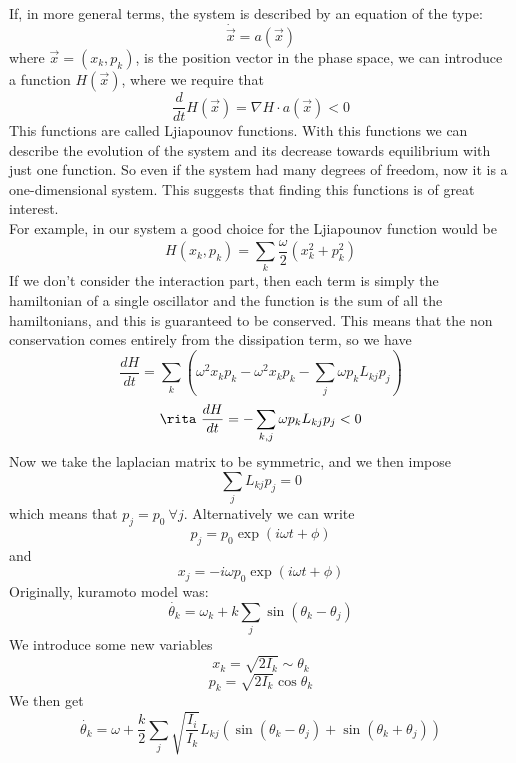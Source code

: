 If, in more general terms, the system is described by an equation of the type:
$$
	\dot{\vec{x}} = a(\vec{x})
$$
where $\vec{x} = (x_k,p_k)$, is the position vector in the phase space, we can introduce a function $H(\vec{x})$, where we require that
$$
	\frac{d}{dt}H(\vec{x}) = \nabla H\cdot a(\vec{x}) < 0
$$
This functions are called Ljiapounov functions. With this functions we can describe the evolution of the system and its decrease towards equilibrium with just one function. So even if the system had many degrees of freedom, now it is a one-dimensional system. This suggests that finding this functions is of great interest. \\
For example, in our system a good choice for the Ljiapounov function would be
$$
	H(x_k,p_k) = \sum_k \frac{\omega}{2}(x^2_k + p^2_k)
$$
If we don't consider the interaction part, then each term is simply the hamiltonian of a single oscillator and the function is the sum of all the hamiltonians, and this is guaranteed to be conserved. This means that the non conservation comes entirely from the dissipation term, so we have
$$
	\frac{dH}{dt} = \sum_k \left( \omega^2 x_kp_k - \omega^2 x_kp_k - \sum_j \omega p_k L_{kj} p_j \right) 
$$
$$
	\rita \ \frac{dH}{dt} = -\sum_{k,j} \omega p_k L_{kj}p_j < 0
$$
Now we take the laplacian matrix to be symmetric, and we then impose
$$
	\sum_j L_{kj}p_j = 0
$$
which means that $p_j = p_0 \ \forall j$. Alternatively we can write
$$
	p_j = p_0 \exp(i\omega t + \phi)
$$
and
$$
	x_j = -i\omega p_0 \exp(i\omega t + \phi)
$$
Originally, kuramoto model was:
$$
	\dot{\theta_k} = \omega_k + k\sum_j \sin(\theta_k - \theta_j)
$$
We introduce some new variables 
$$
	x_k = \sqrt{2I_k} \sim \theta_k
$$
$$
	p_k = \sqrt{2I_k} \cos \theta_k
$$
We then get
$$
	\dot{\theta_k} = \omega + \frac{k}{2}\sum_j \sqrt{\frac{I_i}{I_k}}L_{kj}(\sin(\theta_k - \theta_j) + \sin(\theta_k + \theta_j))
$$


